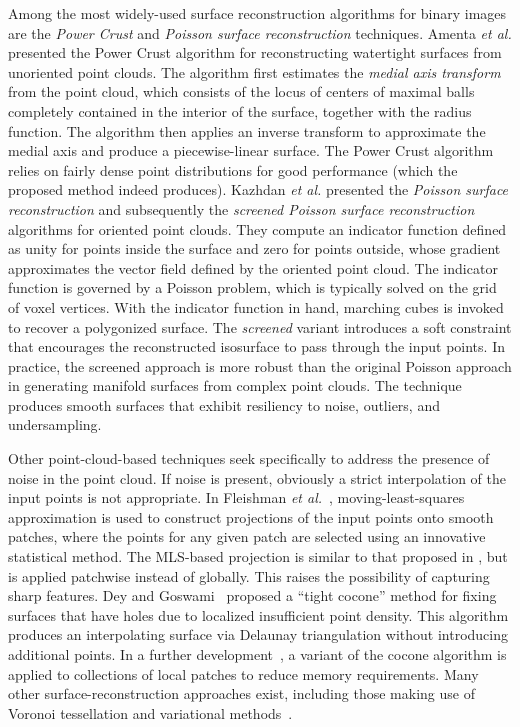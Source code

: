 Among the most widely-used surface reconstruction algorithms for binary images are the \textit{Power Crust} and \textit{Poisson surface reconstruction} techniques. Amenta \textit{et al.} \cite{amenta_2001} presented the Power Crust algorithm for reconstructing watertight surfaces from unoriented point clouds. The algorithm first estimates the \textit{medial axis transform} from the point cloud, which consists of the locus of centers of maximal balls completely contained in the interior of the surface, together with the radius function. The algorithm then applies an inverse transform to approximate the medial axis and produce a piecewise-linear surface. The Power Crust algorithm relies on fairly dense point distributions for good performance (which the proposed method indeed produces). Kazhdan \textit{et al.} presented the \textit{Poisson surface reconstruction} \cite{kazhdan_2008} and subsequently the \textit{screened Poisson surface reconstruction} \cite{kazhdan_2013} algorithms for oriented point clouds. They compute an indicator function defined as unity for points inside the surface and zero for points outside, whose gradient approximates the vector field defined by the oriented point cloud. The indicator function is governed by a Poisson problem, which is typically solved on the grid of voxel vertices.  With the indicator function in hand, marching cubes is invoked to recover a polygonized surface.  The \textit{screened} variant introduces a soft constraint that encourages the reconstructed isosurface to pass through the input points. In practice, the screened approach is more robust than the original Poisson approach in generating manifold surfaces from complex point clouds. The technique produces smooth surfaces that exhibit resiliency to noise, outliers, and undersampling.

Other point-cloud-based techniques seek specifically to address the presence of noise in the point cloud.  If noise is present, obviously a strict interpolation of the input points is not appropriate.  In Fleishman \textit{et al.}~\cite{fleishman2005}, moving-least-squares approximation is used to construct projections of the input points onto smooth patches, where the points for any given patch are selected using an innovative statistical method.  The MLS-based projection is similar to that proposed in \cite{levin2004}, but is applied patchwise instead of globally.  This raises the possibility of capturing sharp features. Dey and Goswami~\cite{dey2003} proposed a ``tight cocone'' method for fixing surfaces that have holes due to localized insufficient point density.  This algorithm produces an interpolating surface via Delaunay triangulation without introducing additional points.  In a further development~\cite{dey2011}, a variant of the cocone algorithm is applied to collections of local patches to reduce memory requirements.  Many other surface-reconstruction approaches exist, including those making use of Voronoi tessellation and variational methods~\cite{berger}.

